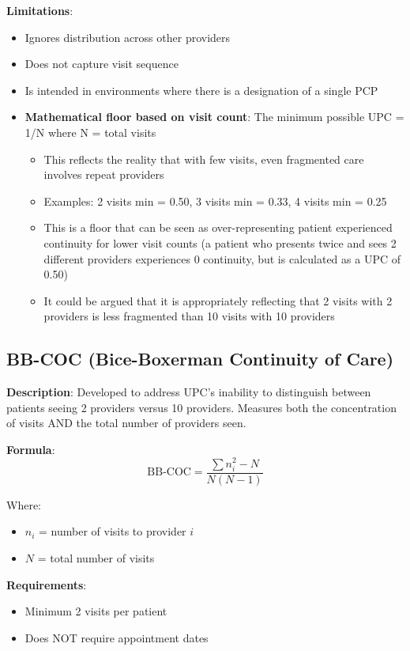 \documentclass[11pt,a4paper]{article}
\newcommand{\bbcoc}{\text{BB-COC}}
\begin{document}
\textbf{Limitations}:
\begin{itemize}
\item Ignores distribution across other providers
\item Does not capture visit sequence
\item Is intended in environments where there is a designation of a single PCP
\item \textbf{Mathematical floor based on visit count}: The minimum possible UPC = 1/N where N = total visits
\begin{itemize}
\item This reflects the reality that with few visits, even fragmented care involves repeat providers
\item Examples: 2 visits min = 0.50, 3 visits min = 0.33, 4 visits min = 0.25
\item This is a floor that can be seen as over-representing patient experienced continuity for lower visit counts (a patient who presents twice and sees 2 different providers experiences 0 continuity, but is calculated as a UPC of 0.50)
\item It could be argued that it is appropriately reflecting that 2 visits with 2 providers is less fragmented than 10 visits with 10 providers
\end{itemize}
\end{itemize}

\subsection{BB-COC (Bice-Boxerman Continuity of Care)}

\textbf{Description}: Developed to address UPC's inability to distinguish between patients seeing 2 providers versus 10 providers. Measures both the concentration of visits AND the total number of providers seen.

\textbf{Formula}:
\begin{equation}
\bbcoc = \frac{\sum n_i^2 - N}{N(N-1)}
\end{equation}

Where:
\begin{itemize}
\item $n_i$ = number of visits to provider $i$
\item $N$ = total number of visits
\end{itemize}

\textbf{Requirements}:
\begin{itemize}
\item Minimum 2 visits per patient
\item Does NOT require appointment dates
\end{itemize}
\end{document}
